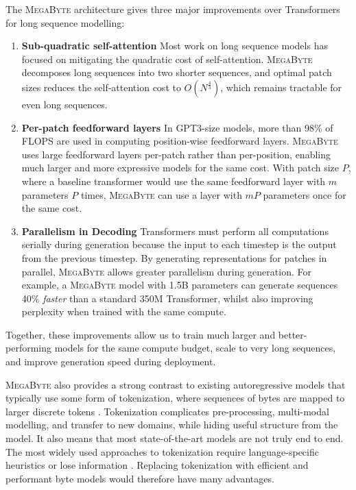 \documentclass{article}
\newcommand{\fastslow}[0]{\textsc{MegaByte}\xspace}
\newcommand{\megabyte}[0]{\fastslow}
\newcommand{\mike}[1]{\textcolor{blue}{[Mike: #1]}}
\theoremstyle{plain}
\theoremstyle{definition}
\theoremstyle{remark}
\begin{document}
The \megabyte architecture gives three major improvements over Transformers for long sequence modelling:
\begin{enumerate}
    \item \textbf{Sub-quadratic self-attention} Most work on long sequence models has focused on mitigating the quadratic cost of self-attention. \megabyte decomposes long sequences into two shorter sequences, and optimal patch sizes reduces the self-attention cost to $O(N^{\frac{4}{3}})$, which remains tractable for even long sequences.
    \item \textbf{Per-patch feedforward layers} In GPT3-size models, more than 98\% of FLOPS are used in computing position-wise feedforward layers. \megabyte uses large feedforward layers per-patch rather than per-position, enabling much larger and more expressive models for the same cost. With patch size $P$, where a baseline transformer would use the same feedforward layer with $m$ parameters $P$ times, \megabyte can use a layer with $mP$ parameters once for the same cost.
    \item \textbf{Parallelism in Decoding} Transformers must perform all computations serially during generation because the input to each timestep is the output from the previous timestep. By generating representations for patches in parallel, \megabyte allows greater parallelism during generation. For example, a \megabyte model with 1.5B parameters can generate sequences 40\% \emph{faster} than a standard 350M Transformer, whilst also improving perplexity when trained with the same compute. %
\end{enumerate}

Together, these improvements allow us to train much larger and better-performing models for the same compute budget, scale to very long sequences, and improve generation speed during deployment.



\fastslow also provides a strong contrast to existing autoregressive models that typically use some form of tokenization, where sequences of bytes are mapped to larger discrete tokens \citep{bpe,dalle,hubert}.
Tokenization complicates pre-processing, multi-modal modelling, and transfer to new domains, while hiding useful structure from the model. It also means that most state-of-the-art models are not truly end to end.
The most widely used approaches to tokenization require language-specific heuristics \citep{gpt2} or lose information \citep{dalle}.
Replacing tokenization with efficient and performant byte models would therefore have many advantages.
\end{document}

